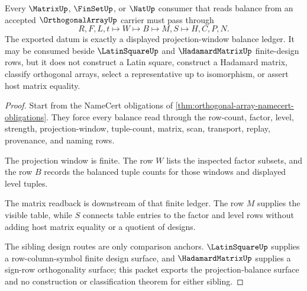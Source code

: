 \begin{theorem}
\label{thm:orthogonal-array-projection-balance}
Every $\MatrixUp$, $\FinSetUp$, or $\NatUp$ consumer that reads balance from an accepted $\OrthogonalArrayUp$ carrier must pass through
$$
R,F,L,t \longmapsto W \longmapsto B \longmapsto M,S \longmapsto H,C,P,N .
$$
The exported datum is exactly a displayed projection-window balance ledger. It may be consumed beside $\LatinSquareUp$ and $\HadamardMatrixUp$ finite-design rows, but it does not construct a Latin square, construct a Hadamard matrix, classify orthogonal arrays, select a representative up to isomorphism, or assert host matrix equality.
\end{theorem}
\begin{proof}
Start from the NameCert obligations of \autoref{thm:orthogonal-array-namecert-obligations}. They force every balance read through the row-count, factor, level, strength, projection-window, tuple-count, matrix, scan, transport, replay, provenance, and naming rows.

The projection window is finite. The row $W$ lists the inspected factor subsets, and the row $B$ records the balanced tuple counts for those windows and displayed level tuples.

The matrix readback is downstream of that finite ledger. The row $M$ supplies the visible table, while $S$ connects table entries to the factor and level rows without adding host matrix equality or a quotient of designs.

The sibling design routes are only comparison anchors. $\LatinSquareUp$ supplies a row-column-symbol finite design surface, and $\HadamardMatrixUp$ supplies a sign-row orthogonality surface; this packet exports the projection-balance surface and no construction or classification theorem for either sibling.
\end{proof}


